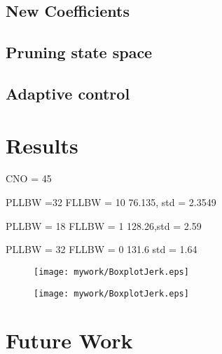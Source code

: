 \subsection{New Coefficients}

\subsection{Pruning state space}

\subsection{Adaptive control}

\section{Results}


CNO = 45

PLLBW =32
FLLBW = 10
76.135, std = 2.3549

PLLBW = 18
FLLBW = 1
128.26,std =  2.59 

PLLBW = 32
FLLBW = 0
131.6 std = 1.64

\begin{figure}[!htb] 
    \centering
    \texttt{[image: mywork/BoxplotJerk.eps]} 
    \caption{}
    \label{fig:BoxplotJerk}
\end{figure}


\begin{figure}[!htb] 
    \centering
    \texttt{[image: mywork/BoxplotJerk.eps]} 
    \caption{}
    \label{fig:BoxplotPhaseJitter}
\end{figure}



\section{Future Work}
